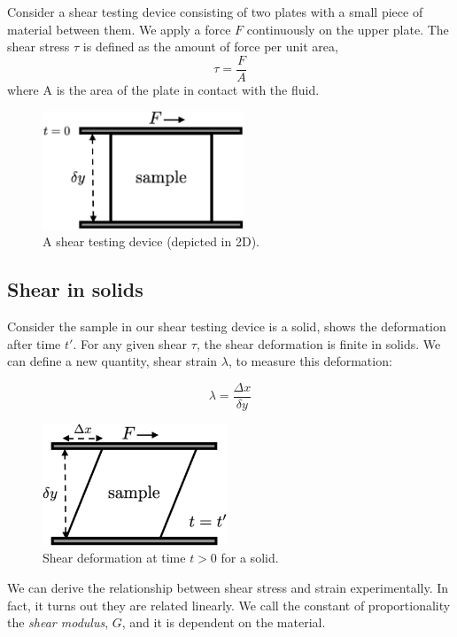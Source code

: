 Consider a shear testing device consisting of two plates with a small piece of material between them. We apply a force $F$ continuously on the upper plate. The shear stress $\tau$ is defined as the amount of force per unit area,
\begin{equation}
  \tau = \frac{F}{A}
\end{equation}
where A is the area of the plate in contact with the fluid.

\begin{figure}[h] \label{fig:shear-testing}
  \centering
  \includegraphics[width=6cm]{fig/shear-testing.png}
  \caption{A shear testing device (depicted in 2D).}
\end{figure}

\subsection{Shear in solids}

Consider the sample in our shear testing device is a solid,  shows the deformation after time $t'$. For any given shear $\tau$, the shear deformation is finite in solids. We can define a new quantity, shear strain $\lambda$, to measure this deformation:

\begin{equation}
  \lambda = \frac{ \Delta x }{ \delta y }
\end{equation}

\begin{figure} \label{fig:shear-solids}
  \centering
  \includegraphics[width=5.5cm]{fig/shear-solid.png}
  \caption{Shear deformation at time $t>0$ for a solid.}
\end{figure}

We can derive the relationship between shear stress and strain experimentally. In fact, it turns out they are related linearly. We call the constant of proportionality the \textit{shear modulus}, $G$, and it is dependent on the material.

